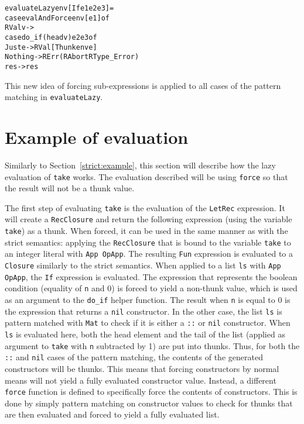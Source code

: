 \begin{alltt}
  evaluateLazy env [If e1 e2 e3]   =
    case evalAndForce env [e1] of
      RVal v ->
        case do_if (head v) e2 e3 of
          Just e  -> RVal [Thunk env e]
          Nothing -> RErr (RAbort RType_Error)
      res -> res
\end{alltt}

This new idea of forcing sub-expressions is applied to all cases of the
pattern matching in \texttt{evaluateLazy}.

\section{Example of evaluation}
\label{lazy:example}
Similarly to Section~\ref{strict:example}, this section will describe how the
lazy evaluation of \texttt{take} works. The evaluation described will be using
\texttt{force} so that the result will not be a thunk value.

The first step of evaluating \texttt{take} is the evaluation of the
\texttt{LetRec} expression. It will create a \texttt{RecClosure} and return
the following expression (using the variable \texttt{take}) as a thunk.
When forced, it can be used in the same manner as with the strict semantics:
applying the \texttt{RecClosure} that is bound to the variable \texttt{take}
to an integer literal with \texttt{App OpApp}. The resulting \texttt{Fun}
expression is evaluated to a \texttt{Closure} similarly to the strict semantics.
When applied to a list \texttt{ls} with \texttt{App OpApp}, the \texttt{If}
expression is evaluated. The expression that represents the boolean condition
(equality of \texttt{n} and 0) is
forced to yield a non-thunk value, which is used as an argument to the
\texttt{do\_if} helper function. The result when \texttt{n} is equal to 0 is the
expression that returns a \texttt{nil} constructor. In the other case, the list
\texttt{ls} is pattern matched with \texttt{Mat} to check if it is either a
\texttt{::} or \texttt{nil} constructor. When \texttt{ls} is evaluated here,
both the head element and the tail of the list (applied as argument to
\texttt{take} with \texttt{n} subtracted by 1) are put into thunks. Thus, for
both the \texttt{::} and \texttt{nil} cases of the pattern matching, the contents
of the generated constructors will be thunks. This means
that forcing constructors by normal means will not yield
a fully evaluated constructor value. Instead, a different \texttt{force} function
is defined to specifically force the contents of constructors. This is done by
simply pattern matching on constructor values to check for thunks that are then
evaluated and forced to yield a fully evaluated list.


